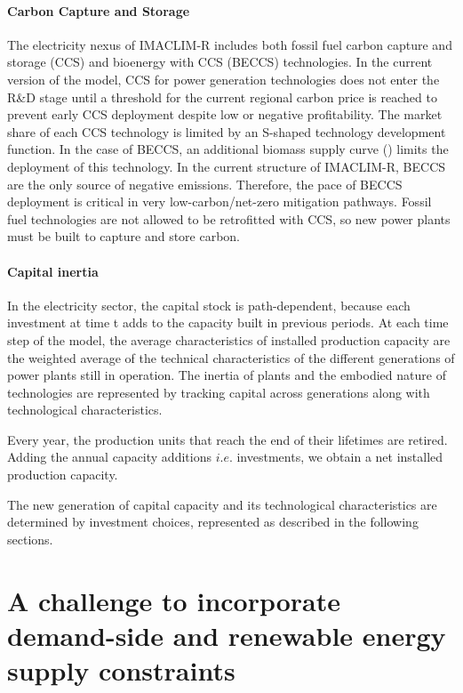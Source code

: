 
\paragraph{ Carbon Capture and Storage }
The electricity nexus of IMACLIM-R includes both fossil fuel carbon capture and storage (CCS) and bioenergy with CCS (BECCS) technologies. In the current version of the model, CCS for power generation technologies does not enter the R\&D stage until a threshold for the current regional carbon price is reached to prevent early CCS deployment despite low or negative profitability. The market share of each CCS technology is limited by an S-shaped technology development function. In the case of BECCS, an additional biomass supply curve (\cite{Hoogwijk2009}) limits the deployment of this technology. In the current structure of IMACLIM-R, BECCS are the only source of negative emissions. Therefore, the pace of BECCS deployment is critical in very low-carbon/net-zero mitigation pathways. Fossil fuel technologies are not allowed to be retrofitted with CCS, so new power plants must be built to capture and store carbon.


\paragraph{ Capital inertia }
In the electricity sector, the capital stock is path-dependent, because each investment at time t adds to the capacity built in previous periods. 
At each time step of the model, the average characteristics of installed production capacity are the weighted average of the technical characteristics of the different generations of power plants still in operation.
The inertia of plants and the embodied nature of technologies are represented by tracking capital across generations along with technological characteristics.


Every year, the production units that reach the end of their lifetimes are retired.
Adding the annual capacity additions $i.e.$ investments, we obtain a net installed production capacity.

The new generation of capital capacity and its technological characteristics are determined by investment choices, represented as described in the following sections.


\section{A challenge to incorporate demand-side and renewable energy supply constraints}

